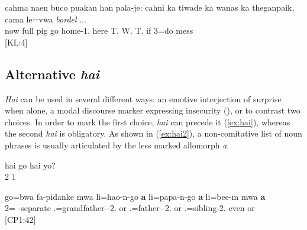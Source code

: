 \ea
\gll cahma naen buco puakan han pala-je: cahni ka tiwade ka wanas ka theganpaik, cama le=vwa \textit{bordel} ...\\
  now full pig go home-1. here  T.  W.  T. if 3=do mess\\
\glt {} {[KL:4]}
\z


 \subsection{Alternative \textit{hai} }
\label{ssec:cntr_hai}
\textit{Hai} can be used in several different ways: an emotive interjection of surprise when alone, a modal discourse marker expressing insecurity (), or to contrast two choices. In order to mark the first choice, \textit{hai} can precede it (\ref{ex:hai}), whereas the second \textit{hai} is obligatory. As shown in (\ref{ex:hai2}), a non-comitative list of noun phrases is usually articulated by the less marked allomorph \textit{a}.
 
\ea
\label{ex:hai}
\gll hai go hai yo? \\
  2  1\\
\glt {}
\z

\ea\label{ex:hai2}
\gll go=bwa fa-pidanke mwa li=hao-n-go \textbf{a} li=papa-n-go \textbf{a} li=bee-m mwa \textbf{a}\\
 2= -separate  .=grandfather--2. or .=father--2. or .=sibling-2. even or\\
\glt {} {[CP1:42]}
\z
